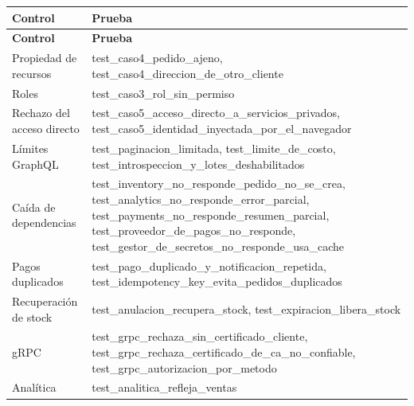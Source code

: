 \documentclass[10pt,letterpaper]{article}
\begin{document}
{\footnotesize
\begin{longtable}{|P{\tabcolsep\relax}|P{\tabcolsep\relax}|}
\hline
\textbf{Control} & \textbf{Prueba} \\ \hline
\endfirsthead
\hline
\textbf{Control} & \textbf{Prueba} \\ \hline
\endhead
Propiedad de recursos & test\_\allowbreak{}caso4\_\allowbreak{}pedido\_\allowbreak{}ajeno, test\_\allowbreak{}caso4\_\allowbreak{}direccion\_\allowbreak{}de\_\allowbreak{}otro\_\allowbreak{}cliente \\ \hline
Roles & test\_\allowbreak{}caso3\_\allowbreak{}rol\_\allowbreak{}sin\_\allowbreak{}permiso \\ \hline
Rechazo del acceso directo & test\_\allowbreak{}caso5\_\allowbreak{}acceso\_\allowbreak{}directo\_\allowbreak{}a\_\allowbreak{}servicios\_\allowbreak{}privados, test\_\allowbreak{}caso5\_\allowbreak{}identidad\_\allowbreak{}inyectada\_\allowbreak{}por\_\allowbreak{}el\_\allowbreak{}navegador \\ \hline
Límites GraphQL & test\_\allowbreak{}paginacion\_\allowbreak{}limitada, test\_\allowbreak{}limite\_\allowbreak{}de\_\allowbreak{}costo, test\_\allowbreak{}introspeccion\_\allowbreak{}y\_\allowbreak{}lotes\_\allowbreak{}deshabilitados \\ \hline
Caída de dependencias & test\_\allowbreak{}inventory\_\allowbreak{}no\_\allowbreak{}responde\_\allowbreak{}pedido\_\allowbreak{}no\_\allowbreak{}se\_\allowbreak{}crea, test\_\allowbreak{}analytics\_\allowbreak{}no\_\allowbreak{}responde\_\allowbreak{}error\_\allowbreak{}parcial, test\_\allowbreak{}payments\_\allowbreak{}no\_\allowbreak{}responde\_\allowbreak{}resumen\_\allowbreak{}parcial, test\_\allowbreak{}proveedor\_\allowbreak{}de\_\allowbreak{}pagos\_\allowbreak{}no\_\allowbreak{}responde, test\_\allowbreak{}gestor\_\allowbreak{}de\_\allowbreak{}secretos\_\allowbreak{}no\_\allowbreak{}responde\_\allowbreak{}usa\_\allowbreak{}cache \\ \hline
Pagos duplicados & test\_\allowbreak{}pago\_\allowbreak{}duplicado\_\allowbreak{}y\_\allowbreak{}notificacion\_\allowbreak{}repetida, test\_\allowbreak{}idempotency\_\allowbreak{}key\_\allowbreak{}evita\_\allowbreak{}pedidos\_\allowbreak{}duplicados \\ \hline
Recuperación de stock & test\_\allowbreak{}anulacion\_\allowbreak{}recupera\_\allowbreak{}stock, test\_\allowbreak{}expiracion\_\allowbreak{}libera\_\allowbreak{}stock \\ \hline
gRPC & test\_\allowbreak{}grpc\_\allowbreak{}rechaza\_\allowbreak{}sin\_\allowbreak{}certificado\_\allowbreak{}cliente, test\_\allowbreak{}grpc\_\allowbreak{}rechaza\_\allowbreak{}certificado\_\allowbreak{}de\_\allowbreak{}ca\_\allowbreak{}no\_\allowbreak{}confiable, test\_\allowbreak{}grpc\_\allowbreak{}autorizacion\_\allowbreak{}por\_\allowbreak{}metodo \\ \hline
Analítica & test\_\allowbreak{}analitica\_\allowbreak{}refleja\_\allowbreak{}ventas \\ \hline
\end{longtable}}
\end{document}
